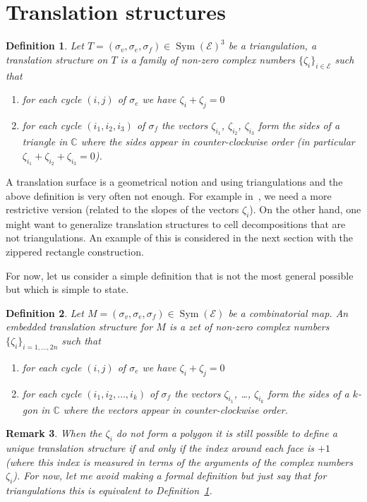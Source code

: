 \documentclass{article}
\def\CC{\mathbb{C}}
\def\cE{\mathcal{E}}
\def\Sym{\operatorname{Sym}}
\newtheorem{definition}{Definition}
\newtheorem{remark}[definition]{Remark}
\begin{document}
\section{Translation structures}
\begin{definition}
\label{def:FlatTriangulation}
Let $T = (\sigma_v, \sigma_e, \sigma_f) \in \Sym(\cE)^3$ be a 
triangulation, a \emph{translation structure} on $T$
is a family of non-zero complex numbers $\{\zeta_i\}_{i\in\cE}$
such that
\begin{enumerate}
\item for each cycle $(i,j)$ of $\sigma_e$ we have $\zeta_i + \zeta_j = 0$
\item for each cycle $(i_1,i_2,i_3)$ of $\sigma_f$ 
the vectors $\zeta_{i_1}$, $\zeta_{i_2}$, $\zeta_{i_3}$ form the
sides of a triangle in $\CC$ where the sides appear in counter-clockwise order
(in particular $\zeta_{i_1} + \zeta_{i_2} + \zeta_{i_3} = 0$).
\end{enumerate}
\end{definition}
A translation surface is a geometrical notion and using triangulations
and the above definition is very often not enough.
For example in~\cite{veerer}, we need a more restrictive version
(related to the slopes of the vectors $\zeta_i$).
On the other hand, one might want to generalize translation structures
to cell decompositions that are not triangulations. An example of
this is considered in the next section with the zippered rectangle
construction.

For now, let us consider a simple definition that is not the most
general possible but which is simple to state.
\begin{definition}
\label{def:EmbeddedTranslationStructure}
Let $M = (\sigma_v, \sigma_e, \sigma_f) \in \Sym(\cE)$ be a combinatorial
map. An \emph{embedded translation structure} for $M$ is a zet of non-zero
complex numbers $\{\zeta_i\}_{i=1,\ldots,2n}$ such that
\begin{enumerate}
\item for each cycle $(i,j)$ of $\sigma_e$ we have
$\zeta_i + \zeta_j = 0$
\item for each cycle $(i_1,i_2,\ldots,i_k)$ of $\sigma_f$ the vectors
$\zeta_{i_1}$, \ldots, $\zeta_{i_k}$ form the sides of a $k$-gon in
$\CC$ where the vectors appear in counter-clockwise order.
\end{enumerate}
\end{definition}

\begin{remark}
When the $\zeta_i$ do not form a polygon it is still
possible to define a unique translation structure if and
only if the index around each face is $+1$ (where this index is measured in terms
of the arguments of the complex numbers $\zeta_i$). For now, let me avoid making
a formal definition but just say that for triangulations
this is equivalent to Definition~\ref{def:FlatTriangulation}.
\end{remark}
\end{document}
